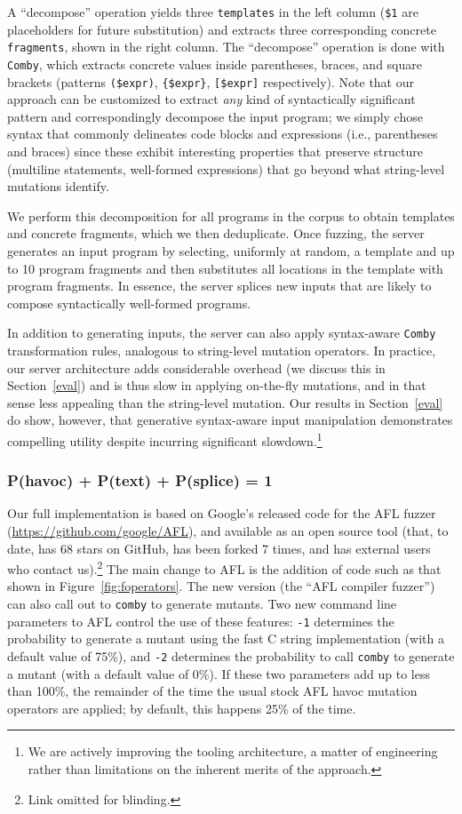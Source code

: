 A ``decompose'' operation yields three \texttt{templates} in the left column
({\tt\color{dkgreen}\$1} are placeholders for future substitution) and extracts
three corresponding concrete \texttt{fragments}, shown in the right column. 
The ``decompose'' operation is done with \texttt{Comby}, which extracts concrete
values inside parentheses, braces, and square brackets (patterns
\texttt{(\$expr)}, \texttt{\{\$expr\}}, \texttt{[\$expr]} respectively). Note
that our approach can be customized to extract \emph{any} kind of syntactically
significant pattern and correspondingly decompose the input program; we simply
chose syntax that commonly delineates code blocks and expressions (i.e.,
parentheses and braces) since these exhibit interesting properties that
preserve structure (multiline statements, well-formed expressions) that go
beyond what string-level mutations identify.

We perform this decomposition for all programs in the corpus to obtain
templates and concrete fragments, which we then deduplicate. Once fuzzing, the
server generates an input program by selecting, uniformly at random, a template
and up to 10 program fragments and then substitutes all locations in the
template with program fragments. In essence, the server splices new inputs that
are likely to compose syntactically well-formed programs.

In addition to generating inputs, the server can also apply syntax-aware
\texttt{Comby} transformation rules, analogous to string-level mutation
operators. In practice, our server architecture adds considerable overhead (we
discuss this in Section~\ref{eval}) and is thus slow in applying
on-the-fly mutations, and in that sense less
appealing than the string-level mutation. Our
results in Section~\ref{eval} do show, however, that generative
syntax-aware input manipulation demonstrates compelling utility despite
incurring significant slowdown.\footnote{We are actively improving the tooling
architecture, a matter of engineering rather than
limitations on the inherent merits of the approach.}

\subsubsection{P(havoc) + P(text) + P(splice) = 1}

Our full implementation is based on Google's released code for the AFL
fuzzer (\url{https://github.com/google/AFL}), and available as an open source tool (that, to date, has 68
stars on GitHub, has been forked 7 times, and has external users who
contact us).\footnote{Link omitted for
  blinding.}  The main change to AFL is the addition of code such as that shown in
Figure~\ref{fig:foperators}.  The new version (the ``AFL compiler
fuzzer'') can also call out to {\tt comby} to generate mutants.  Two
new command line parameters to AFL control the use of these features:
{\tt -1} determines the probability to generate a mutant using the
fast C string implementation (with a default value of 75\%), and {\tt -2} determines the probability
to call {\tt comby} to generate a mutant (with a default value of
0\%).  If these two parameters add up to less than 100\%, the
remainder of the time the usual stock AFL havoc mutation operators are
applied; by default, this happens 25\% of the time.
